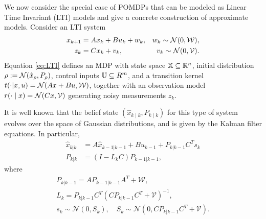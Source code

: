 \documentclass{ifacconf}
\begin{document}
We now consider the special case of POMDPs that can be modeled as Linear Time Invariant (LTI) models and give a concrete construction of approximate models. Consider an LTI system
\begin{equation} 
  \label{eq:LTI} 
    \begin{aligned}
    x_{k+1}&=A x_{k} + B u_k+ w_k, & w_k\sim \mathcal N(0,\mathcal{W}), \\
    z_k&=Cx_k+v_k, & v_k\sim \mathcal N(0,\mathcal{V}).
  \end{aligned} 
\end{equation}
Equation \eqref{eq:LTI} defines an MDP with state space ${\mathbb{X}}\subseteq\mathbb R^n$, initial distribution $\rho:=\mathcal N(\hat x_\rho,P_\rho)$, control inputs ${\mathbb{U}} \subseteq R^m$, and a transition kernel $t(\cdot | x, u ) = \mathcal N(Ax + Bu, \mathcal{W})$, together with an observation model $r(\cdot \mid x) = \mathcal N(Cx, \mathcal{V})$ generating noisy measurements $z_k$.
 
It is well known that the belief state $(\hat x_{k \mid k}, P_{k \mid k})$ for this type of system evolves over the space of Gaussian distributions, and is given by the Kalman filter equations. In particular,
\begin{align}
  \label{eq:beliefx} \hat x_{k|k}&=A\hat x_{k-1|k-1}+Bu_{k-1}+P_{k|k-1}C^Ts_k \\
  \label{eq:beliefP} P_{k|k}&= (I - L_k C) P_{k-1|k-1},
\end{align}
where 
\begin{equation}
\begin{aligned}
  P_{k|k-1}=AP_{k-1|k-1}A^T+\mathcal W, \\
  L_k = P_{k|k-1}C^T\left(CP_{k|k-1}C^T+\mathcal V\right)^{-1}, \\
  s_k\sim \mathcal N (0, S_k ), \quad S_k \sim \mathcal N (0, CP_{k|k-1}C^T+\mathcal V ).
\end{aligned}
\end{equation}
\end{document}
